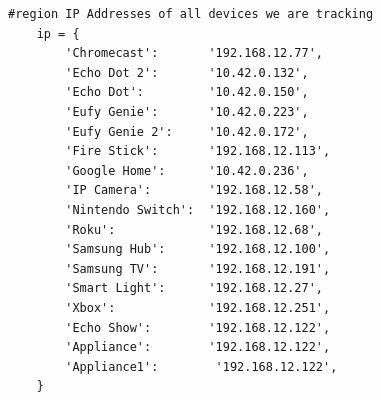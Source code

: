 \begin{minipage}{\textwidth}
    \begin{lstlisting}[label={lst:ipLookup},caption={IP lookup table in real time iot grapher.}]
    #region IP Addresses of all devices we are tracking
    ip = {
        'Chromecast':       '192.168.12.77',
        'Echo Dot 2':       '10.42.0.132',
        'Echo Dot':         '10.42.0.150',
        'Eufy Genie':       '10.42.0.223',
        'Eufy Genie 2':     '10.42.0.172',
        'Fire Stick':       '192.168.12.113',
        'Google Home':      '10.42.0.236',
        'IP Camera':        '192.168.12.58',
        'Nintendo Switch':  '192.168.12.160',
        'Roku':             '192.168.12.68',
        'Samsung Hub':      '192.168.12.100',
        'Samsung TV':       '192.168.12.191',
        'Smart Light':      '192.168.12.27',
        'Xbox':             '192.168.12.251',
        'Echo Show':        '192.168.12.122',
        'Appliance':        '192.168.12.122',
        'Appliance1':        '192.168.12.122',
    }
    \end{lstlisting}
\end{minipage}
